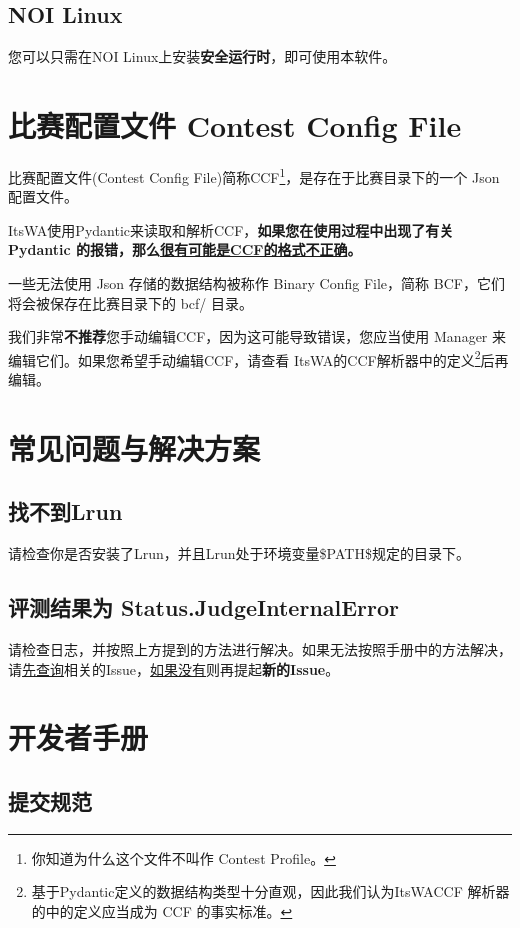 \documentclass[UTF8]{ctexart}
\newcommand{\itswa}{ItsWA}
\begin{document}
        \subsection{NOI Linux}
            您可以只需在NOI Linux上安装\textbf{安全运行时}，即可使用本软件。
    
    \section{比赛配置文件 Contest Config File}
        比赛配置文件(Contest Config File)简称CCF\footnote{你知道为什么这个文件不叫作 Contest Profile。}，是存在于比赛目录下的一个 Json 配置文件。

        \itswa 使用Pydantic来读取和解析CCF，\textbf{如果您在使用过程中出现了有关 Pydantic 的报错，那么\uline{很有可能是CCF的格式不正确}。}
        
        一些无法使用 Json 存储的数据结构被称作 Binary Config File，简称 BCF，它们将会被保存在比赛目录下的 bcf/ 目录。

        我们非常\textbf{不推荐}您手动编辑CCF，因为这可能导致错误，您应当使用 Manager 来编辑它们。如果您希望手动编辑CCF，请查看 \itswa 的CCF解析器中的定义\footnote{基于Pydantic定义的数据结构类型十分直观，因此我们认为\itswa CCF 解析器的中的定义应当成为 CCF 的事实标准。}后再编辑。

    \section{常见问题与解决方案}
        \subsection{找不到Lrun}
            请检查你是否安装了Lrun，并且Lrun处于环境变量\$PATH\$规定的目录下。

        \subsection{评测结果为 Status.JudgeInternalError}
            请检查日志，并按照上方提到的方法进行解决。如果无法按照手册中的方法解决，请\uline{先查询}相关的Issue，\uline{如果没有}则再提起\textbf{新的Issue}。

    \section{开发者手册}
        \subsection{提交规范}
\end{document}
